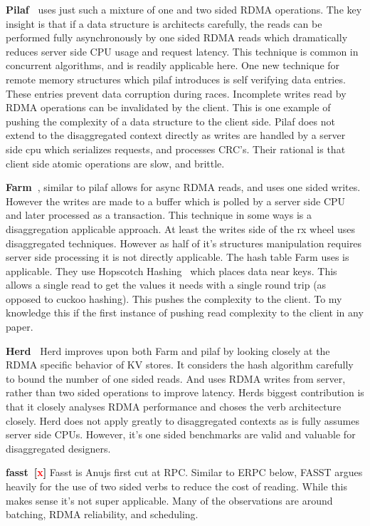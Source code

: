 \textbf{Pilaf~\cite{pilaf}} uses just such a mixture of one and two sided RDMA
operations. The key insight is that if a data structure is architects carefully,
the reads can be performed fully asynchronously by one sided RDMA reads which
dramatically reduces server side CPU usage and request latency. This technique
is common in concurrent algorithms, and is readily applicable here. One new
technique for remote memory structures which pilaf introduces is self verifying
data entries. These entries prevent data corruption during races. Incomplete
writes read by RDMA operations can be invalidated by the client. This is one
example of pushing the complexity of a data structure to the client side. Pilaf
does not extend to the disaggregated context directly as writes are handled by a
server side cpu which serializes requests, and processes CRC's. Their rational
is that client side atomic operations are slow, and brittle. 

\textbf{Farm~\cite{farm}}, similar to pilaf allows for async RDMA reads, and
uses one sided writes. However the writes are made to a buffer which is polled
by a server side CPU and later processed as a transaction. This technique in
some ways is a disaggregation applicable approach. At least the writes side of
the rx wheel uses disaggregated techniques. However as half of it's structures
manipulation requires server side processing it is not directly applicable. The
hash table Farm uses is applicable. They use Hopscotch Hashing~\cite{hopscotch}
which places data near keys. This allows a single read to get the values it
needs with a single round trip (as opposed to cuckoo hashing). This pushes the
complexity to the client. To my knowledge this if the first instance of pushing
read complexity to the client in any paper.

\textbf{Herd~\cite{herd}} Herd improves upon both Farm and pilaf by looking
closely at the RDMA specific behavior of KV stores. It considers the hash
algorithm carefully to bound the number of one sided reads. And uses RDMA writes
from server, rather than two sided operations to improve latency. Herds biggest
contribution is that it closely analyses RDMA performance and choses the verb
architecture closely. Herd does not apply greatly to disaggregated contexts as
is fully assumes server side CPUs. However, it's one sided benchmarks are valid
and valuable for disaggregated designers.

\textbf{fasst~\cite{faast}[\textcolor{red}{x}]} Fasst is Anujs first cut at RPC.
Similar to ERPC below, FASST argues heavily for the use of two sided verbs to
reduce the cost of reading. While this makes sense it's not super applicable.
Many of the observations are around batching, RDMA reliability, and scheduling.

